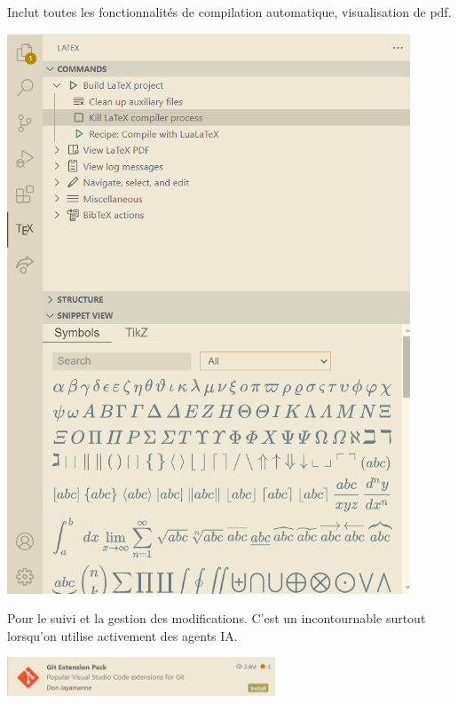 \begin{None}
    \begin{tcbenumerate}[2]
        \tcbitem {}

        Inclut toutes les fonctionnalités de compilation automatique, visualisation de pdf.
        \begin{center}
            \includegraphics[width=0.9\textwidth]{images/IDE/latex_workshop.png}
        \end{center}

        \tcbitem {} 

        Pour le suivi et la gestion des modifications. C'est un incontournable surtout lorsqu'on utilise activement des agents IA. 

        \begin{center}
            \includegraphics[width=8cm]{images/IDE/git_extension_pack.png}
        \end{center}


\end{tcbenumerate}
\end{None}
